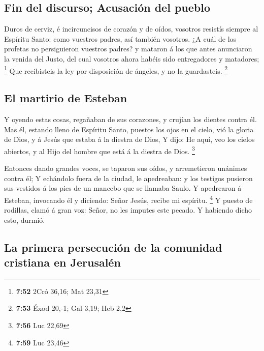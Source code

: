 \hypertarget{fin-del-discurso-acusaciuxf3n-del-pueblo}{%
\subsection{Fin del discurso; Acusación del
pueblo}\label{fin-del-discurso-acusaciuxf3n-del-pueblo}}

 Duros de cerviz, é incircuncisos de corazón y de oídos,
vosotros resistís siempre al Espíritu Santo: como vuestros padres, así
también vosotros.  ¿A cuál de los profetas no persiguieron
vuestros padres? y mataron á los que antes anunciaron la venida del
Justo, del cual vosotros ahora habéis sido entregadores y matadores;
\footnote{\textbf{7:52} 2Cró 36,16; Mat 23,31}  Que
recibisteis la ley por disposición de ángeles, y no la guardasteis.
\footnote{\textbf{7:53} Éxod 20,-1; Gal 3,19; Heb 2,2}

\hypertarget{el-martirio-de-esteban}{%
\subsection{El martirio de Esteban}\label{el-martirio-de-esteban}}

 Y oyendo estas cosas, regañaban de sus corazones, y
crujían los dientes contra él.  Mas él, estando lleno de
Espíritu Santo, puestos los ojos en el cielo, vió la gloria de Dios, y á
Jesús que estaba á la diestra de Dios,  Y dijo: He aquí,
veo los cielos abiertos, y al Hijo del hombre que está á la diestra de
Dios. \footnote{\textbf{7:56} Luc 22,69}

 Entonces dando grandes voces, se taparon sus oídos, y
arremetieron unánimes contra él;  Y echándolo fuera de la
ciudad, le apedreaban: y los testigos pusieron sus vestidos á los pies
de un mancebo que se llamaba Saulo.  Y apedrearon á
Esteban, invocando él y diciendo: Señor Jesús, recibe mi espíritu.
\footnote{\textbf{7:59} Luc 23,46}  Y puesto de rodillas,
clamó á gran voz: Señor, no les imputes este pecado. Y habiendo dicho
esto, durmió.

\hypertarget{la-primera-persecuciuxf3n-de-la-comunidad-cristiana-en-jerusaluxe9n}{%
\subsection{La primera persecución de la comunidad cristiana en
Jerusalén}\label{la-primera-persecuciuxf3n-de-la-comunidad-cristiana-en-jerusaluxe9n}}


